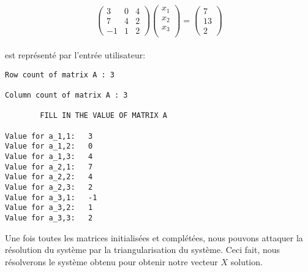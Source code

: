 \documentclass{report}
\begin{document}
\begin{equation}
\begin{pmatrix}
3 & 0 & 4\\
7 & 4 & 2 \\
-1 & 1 & 2
\end{pmatrix} 
\begin{pmatrix}
x_1\\
x_2\\
x_3\\
\end{pmatrix}
=
\begin{pmatrix}
7 \\
13 \\
2
\end{pmatrix}
\end{equation}
\\


est représenté par l'entrée utilisateur:
\begin{lstlisting}[caption=User Input, basicstyle=\fontsize{6}{8}\selectfont]
Row count of matrix A : 3

Column count of matrix A : 3

		FILL IN THE VALUE OF MATRIX A 

Value for a_1,1:   3
Value for a_1,2:   0
Value for a_1,3:   4
Value for a_2,1:   7
Value for a_2,2:   4
Value for a_2,3:   2
Value for a_3,1:   -1
Value for a_3,2:   1
Value for a_3,3:   2

\end{lstlisting}
Une fois toutes les matrices initialisées et complétées, nous pouvons attaquer la résolution du système par la triangularisation du système. Ceci fait, nous résolverons le système obtenu pour obtenir notre vecteur $X$ solution.\\
\end{document}
